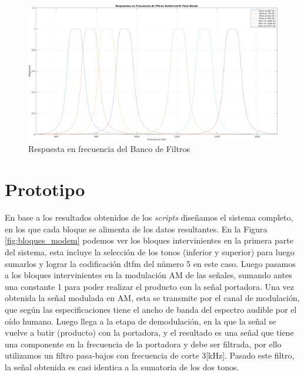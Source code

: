 \begin{figure}[H]
  
\end{figure}

\begin{figure}[H]
  \centering
  \includegraphics[width=\linewidth]{images/desarrollo/freq_filtros.png}
  \caption{Respuesta en frecuencia del Banco de Filtros}
  \label{fig:banco_filtros_resp_frec}
\end{figure}

\begin{figure}[H]
  
\end{figure}

\section{Prototipo}
En base a los resultados obtenidos de los \textit{scripts} diseñamos el sistema completo, en los que cada bloque se alimenta de los datos resultantes. En la Figura \ref{fig:bloques_modem} podemos ver los bloques intervinientes en la primera parte del sistema, esta incluye la selección de los tonos (inferior y superior) para luego sumarlos y lograr la codificación \gls{dtfm} del número 5 en este caso. Luego pasamos a los bloques intervinientes en la modulación AM de las señales, sumando antes una constante 1 para poder realizar el producto con la señal portadora. Una vez obtenida la señal modulada en AM, esta se transmite por el canal de modulación, que según las especificaciones tiene el ancho de banda del espectro audible por el oído humano. Luego llega a la etapa de demodulación, en la que la señal se vuelve a batir (producto) con la portadora, y el resultado es una señal que tiene una componente en la frecuencia de la portadora y debe ser filtrada, por ello utilizamos un filtro pasa-bajos con frecuencia de corte 3[kHz]. Pasado este filtro, la señal obtenida es casi identica a la sumatoria de los dos tonos.


